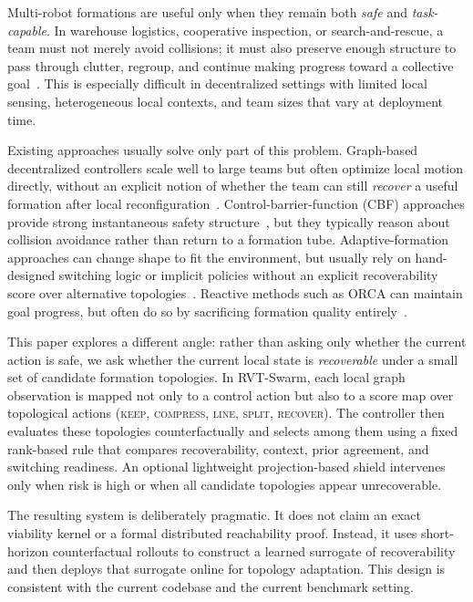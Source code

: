 \documentclass[journal]{IEEEtran}
\begin{document}
Multi-robot formations are useful only when they remain both
\emph{safe} and \emph{task-capable}. In warehouse logistics, cooperative
inspection, or search-and-rescue, a team must not merely avoid
collisions; it must also preserve enough structure to pass through
clutter, regroup, and continue making progress toward a collective
goal~\cite{garg2024safe_multirobot_review,deng2024formation_adaptation,xie2025multi_uav_formation_rl}. This is especially difficult in
decentralized settings with limited local sensing, heterogeneous local
contexts, and team sizes that vary at deployment time.

Existing approaches usually solve only part of this problem.
Graph-based decentralized controllers scale well to large teams but
often optimize local motion directly, without an explicit notion of
whether the team can still \emph{recover} a useful formation after local
reconfiguration~\cite{muthusamy2024gnn_generalizability,goeckner2024magec}.
Control-barrier-function (CBF) approaches provide strong instantaneous
safety structure~\cite{zhang2025gcbf_plus,butler2024collaborative_safety,zhang2025dgppo}, but
they typically reason about collision avoidance rather than return to a
formation tube. Adaptive-formation approaches can change shape to fit
the environment, but usually rely on hand-designed switching logic or
implicit policies without an explicit recoverability score over
alternative topologies~\cite{deng2024formation_adaptation,xie2025multi_uav_formation_rl}.
Reactive methods such as ORCA can maintain goal progress, but often do
so by sacrificing formation quality entirely~\cite{van2011orca}.

This paper explores a different angle: rather than asking only whether
the current action is safe, we ask whether the current local state is
\emph{recoverable} under a small set of candidate formation topologies.
In RVT-Swarm, each local graph observation is mapped not only to a
control action but also to a score map over topological actions
(\textsc{keep}, \textsc{compress}, \textsc{line}, \textsc{split},
\textsc{recover}). The controller then evaluates these topologies
counterfactually and selects among them using a fixed rank-based rule
that compares recoverability, context, prior agreement, and switching
readiness. An optional lightweight projection-based shield intervenes
only when risk is high or when all candidate topologies appear
unrecoverable.

The resulting system is deliberately pragmatic. It does not claim an
exact viability kernel or a formal distributed reachability proof.
Instead, it uses short-horizon counterfactual rollouts to construct a
learned surrogate of recoverability and then deploys that surrogate
online for topology adaptation. This design is consistent with the
current codebase and the current benchmark setting.
\end{document}
